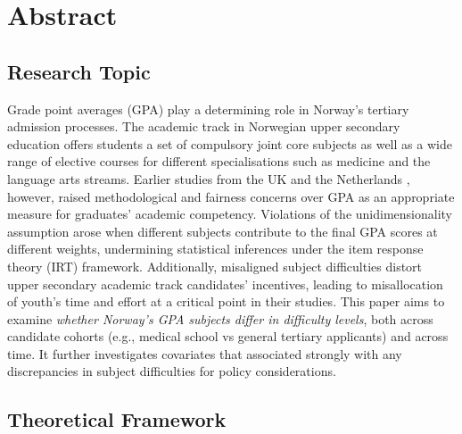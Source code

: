 \section{Abstract}


\subsection{Research Topic}

Grade point averages (GPA) play a determining role in Norway's tertiary admission processes. The academic track in Norwegian upper secondary education offers students a set of compulsory joint core subjects as well as a wide range of elective courses for different specialisations such as medicine and the language arts streams. Earlier studies from the UK \parencite{he:2018} and the Netherlands \parencite{korobko:2008}, however, raised methodological and fairness concerns over GPA as an appropriate measure for graduates' academic competency. Violations of the unidimensionality assumption arose when different subjects contribute to the final GPA scores at different weights, undermining statistical inferences under the item response theory (IRT) framework. Additionally, misaligned subject difficulties distort upper secondary academic track candidates' incentives, leading to misallocation of youth's time and effort at a critical point in their studies. This paper aims to examine \emph{whether Norway's GPA subjects differ in difficulty levels}, both across candidate cohorts (e.g., medical school vs general tertiary applicants) and across time. It further investigates covariates that associated strongly with any discrepancies in subject difficulties for policy considerations.

\subsection{Theoretical Framework}

